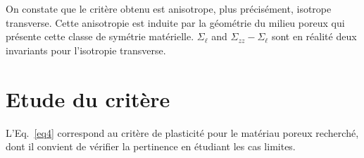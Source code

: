 \documentclass[french,12pt]{exam}
\begin{document}
\begin{questions}
\begin{solution}
On constate que le critère obtenu est anisotrope, plus précisément, isotrope transverse. Cette anisotropie est induite par la géométrie du milieu poreux qui présente cette classe de symétrie matérielle. $\Sigma_{\ell}$ and $\Sigma_{zz}-\Sigma_{\ell}$ sont en réalité deux invariants pour l'isotropie transverse.
\end{solution}
\end{questions}

\section{Etude du critère}
L'Eq.~\eqref{eq4} correspond au critère de plasticité pour le matériau poreux recherché, dont il convient de vérifier la pertinence en étudiant les cas limites.\\
\end{document}
